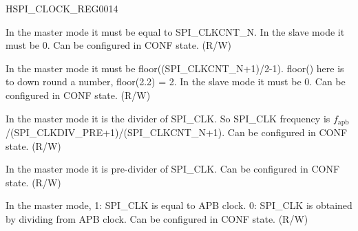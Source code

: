 \begin{register}{H}{SPI\_CLOCK\_REG}{\hexprefix{}0014}\label{regdesc:SPICLOCKREG}
%
%
%
%
%
\regnewline%
\begin{regdesc}\begin{reglist}
\label{fielddesc:SPICLKCNTL}\item [SPI\_CLKCNT\_L] In the master mode it must be equal to SPI\_CLKCNT\_N. In the slave mode it must be 0. Can be configured in CONF state. (R/W)
\label{fielddesc:SPICLKCNTH}\item [SPI\_CLKCNT\_H] In the master mode it must be floor((SPI\_CLKCNT\_N+1)/2-1). floor() here is to down round a number, floor(2.2) = 2. In the slave mode it must be 0. Can be configured in CONF state. (R/W)
\label{fielddesc:SPICLKCNTN}\item [SPI\_CLKCNT\_N] In the master mode it is the divider of SPI\_CLK. So SPI\_CLK frequency is $f_{\textrm{apb}}$/(SPI\_CLKDIV\_PRE+1)/(SPI\_CLKCNT\_N+1). Can be configured in CONF state. (R/W)
\label{fielddesc:SPICLKDIVPRE}\item [SPI\_CLKDIV\_PRE] In the master mode it is pre-divider of SPI\_CLK. Can be configured in CONF state. (R/W)
\label{fielddesc:SPICLKEQUSYSCLK}\item [SPI\_CLK\_EQU\_SYSCLK] In the master mode, 1: SPI\_CLK is equal to APB clock. 0: SPI\_CLK is obtained by dividing from APB clock. Can be configured in CONF state. (R/W)
\end{reglist}\end{regdesc}
\end{register}


